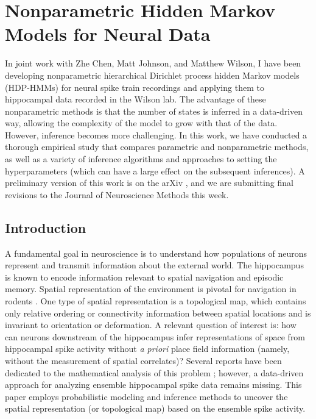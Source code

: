  
\chapter{Nonparametric Hidden Markov Models for Neural Data}

In joint work with Zhe Chen, Matt Johnson, and Matthew Wilson, I have been 
developing nonparametric hierarchical Dirichlet process hidden Markov models 
(HDP-HMMs) for neural spike train recordings and applying them to hippocampal 
data recorded in the Wilson lab. The advantage of these nonparametric methods 
is that the number of states is inferred in a data-driven way, allowing the 
complexity of the model to grow with that of the data. However, inference 
becomes more challenging. In this work, we have conducted a thorough empirical 
study that compares parametric and nonparametric methods, as well as a 
variety of inference algorithms and approaches to setting the hyperparameters 
(which can have a large effect on the subsequent inferences). A preliminary 
version of this work is on the arXiv \cite{linderman2014nonparametric}, and 
we are submitting final revisions to the Journal of Neuroscience Methods 
this week. 

\section{Introduction}

A fundamental goal in neuroscience is to understand how populations of  neurons represent and transmit information about the external world. 
The hippocampus is known to encode information relevant to spatial navigation and episodic memory. 
Spatial representation of the environment is pivotal for navigation in rodents \citep{OKeefe78}.
One type of spatial representation is a topological map, which contains only relative ordering or connectivity information
between spatial locations and is invariant to orientation or deformation. A relevant question of interest is: how can neurons 
downstream of the hippocampus  infer representations of space from 
hippocampal spike  activity without {\em a priori} place field information (namely, without the measurement of spatial correlates)?  
Several reports have been dedicated to the mathematical analysis of this problem \citep{Curto08,Dabaghian12}; however, a data-driven approach 
for analyzing ensemble hippocampal spike data remains missing.  This paper 
employs probabilistic modeling and inference methods to uncover the spatial representation (or topological map) based on the ensemble spike activity. 



